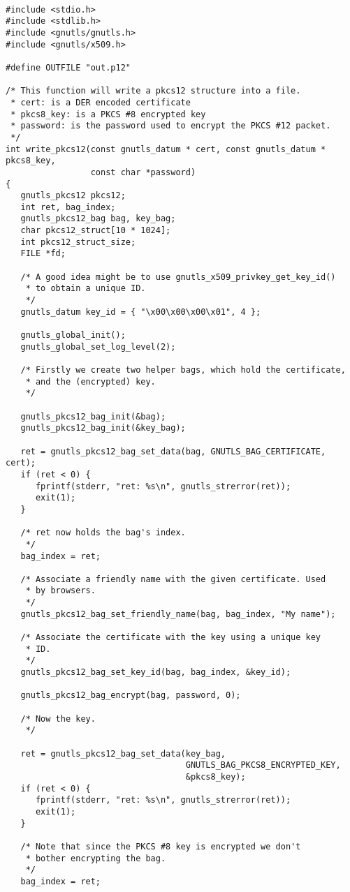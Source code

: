 \begin{verbatim}

#include <stdio.h>
#include <stdlib.h>
#include <gnutls/gnutls.h>
#include <gnutls/x509.h>

#define OUTFILE "out.p12"

/* This function will write a pkcs12 structure into a file.
 * cert: is a DER encoded certificate
 * pkcs8_key: is a PKCS #8 encrypted key
 * password: is the password used to encrypt the PKCS #12 packet.
 */
int write_pkcs12(const gnutls_datum * cert, const gnutls_datum * pkcs8_key,
                 const char *password)
{
   gnutls_pkcs12 pkcs12;
   int ret, bag_index;
   gnutls_pkcs12_bag bag, key_bag;
   char pkcs12_struct[10 * 1024];
   int pkcs12_struct_size;
   FILE *fd;

   /* A good idea might be to use gnutls_x509_privkey_get_key_id()
    * to obtain a unique ID.
    */
   gnutls_datum key_id = { "\x00\x00\x00\x01", 4 };

   gnutls_global_init();
   gnutls_global_set_log_level(2);

   /* Firstly we create two helper bags, which hold the certificate,
    * and the (encrypted) key.
    */

   gnutls_pkcs12_bag_init(&bag);
   gnutls_pkcs12_bag_init(&key_bag);

   ret = gnutls_pkcs12_bag_set_data(bag, GNUTLS_BAG_CERTIFICATE, cert);
   if (ret < 0) {
      fprintf(stderr, "ret: %s\n", gnutls_strerror(ret));
      exit(1);
   }

   /* ret now holds the bag's index.
    */
   bag_index = ret;

   /* Associate a friendly name with the given certificate. Used
    * by browsers.
    */
   gnutls_pkcs12_bag_set_friendly_name(bag, bag_index, "My name");

   /* Associate the certificate with the key using a unique key
    * ID.
    */
   gnutls_pkcs12_bag_set_key_id(bag, bag_index, &key_id);

   gnutls_pkcs12_bag_encrypt(bag, password, 0);

   /* Now the key.
    */

   ret = gnutls_pkcs12_bag_set_data(key_bag,
                                    GNUTLS_BAG_PKCS8_ENCRYPTED_KEY,
                                    &pkcs8_key);
   if (ret < 0) {
      fprintf(stderr, "ret: %s\n", gnutls_strerror(ret));
      exit(1);
   }

   /* Note that since the PKCS #8 key is encrypted we don't
    * bother encrypting the bag.
    */
   bag_index = ret;


\end{verbatim}

